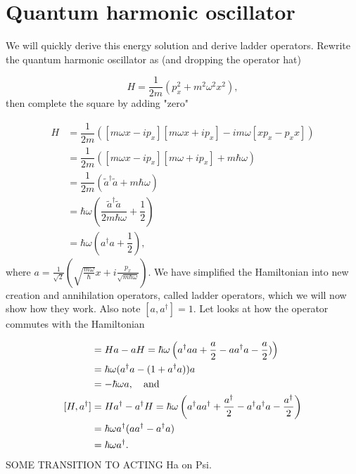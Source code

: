 \section{Quantum harmonic oscillator}
\label{appendix:qho}

We will quickly derive this energy solution and derive ladder operators.
Rewrite the quantum harmonic oscillator as (and dropping the operator hat)

\begin{equation*}
  H = \dfrac{1}{2m} \left( p_x^2 + m^2 \omega^2 x^2 \right),
\end{equation*}
then complete the square by adding "zero"

\begin{align}
  H &= \dfrac{1}{2m} \left( [m\omega x - i p_x] [m\omega x + i p_x] -im\omega[xp_x - p_x x] \right) \nonumber \\
  &= \dfrac{1}{2m} \left( [m\omega x - i p_x] [m\omega + i p_x] + m \hbar \omega \right) \nonumber \\
  &= \dfrac{1}{2m} \left( \tilde{a}^{\dagger} \tilde{a} + m\hbar \omega \right) \nonumber \\
  &= \hbar \omega \left( \dfrac{\tilde{a}^{\dagger} \tilde{a} }{2m\hbar \omega} + \dfrac{1}{2} \right) \nonumber \\
  &= \hbar \omega \left( a^{\dagger} a + \dfrac{1}{2} \right),
\end{align}
where $a = \tfrac{1}{\sqrt{2}} \left(\sqrt{\tfrac{m\omega}{\hbar}} x + i \tfrac{p_x}{\sqrt{m\hbar\omega}} \right)$.
We have simplified the Hamiltonian into new creation and annihilation operators, called ladder operators, which we will now show how they work.
Also note $[a, a^{\dagger}] = 1$.
Let looks at how the operator commutes with the Hamiltonian

\begin{align}
  [H, a] &= Ha - aH = \hbar \omega \left( \ca a a + \dfrac{a}{2} - a \ca a - \dfrac{a}{2}) \right) \nonumber \\
      &= \hbar \omega (\ca a  - (1 + \ca a) ) a \nonumber \\
      &= - \hbar \omega a, \quad \text{and} \\
  [H, \ca] &= H\ca - \ca H = \hbar \omega \left( \ca a \ca + \dfrac{\ca}{2} - \ca \ca a - \dfrac{\ca}{2}\right) \nonumber \\
      &= \hbar \omega \ca ( a\ca - \ca a) \nonumber \\
      &= \hbar \omega \ca.
\end{align}
SOME TRANSITION TO ACTING Ha on Psi.

